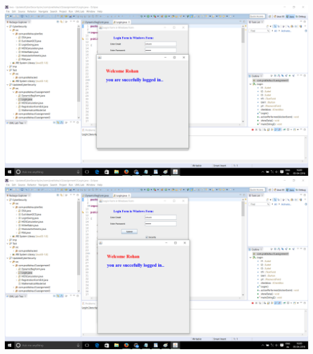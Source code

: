 \documentclass[a4paper,12pt]{article}
\begin{document}
\includegraphics[width=\textwidth]{5}
\includegraphics[width=\textwidth]{6}
\end{document}
